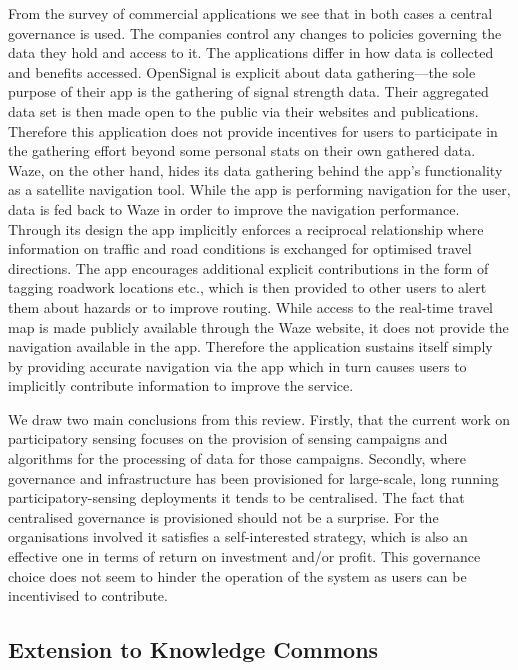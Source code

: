 From the survey of commercial applications we see that 
in both cases a central governance is used. The companies control any changes to policies governing the data they hold and access to it. The applications differ in how data is collected and benefits accessed. 
OpenSignal is explicit about data gathering---the sole purpose of their app is the gathering of signal strength data. 
Their aggregated data set is then made open to the public via their websites and publications. Therefore this application does not provide incentives for users to participate in the gathering effort beyond some personal stats on their own gathered data. Waze, on the other hand, hides its data gathering behind the app's functionality as a satellite navigation tool. 
While the app is performing navigation for the user, data is fed back to Waze in order to improve the navigation performance. 
Through its design the app implicitly enforces a reciprocal relationship where information on traffic and road conditions is exchanged for optimised travel directions. 
The app encourages additional explicit contributions in the form of tagging roadwork locations etc., which is then provided to other users to alert them about hazards or to improve routing. 
While access to the real-time travel map is made publicly available through the Waze website, it does not provide the navigation available in the app. Therefore the application sustains itself simply by providing accurate navigation via the app which in turn causes users to implicitly contribute information to improve the service.



We draw two main conclusions from this review. Firstly, that the current work on participatory sensing focuses on the provision of sensing campaigns and algorithms for the processing of data for those campaigns. Secondly, where governance and infrastructure has been provisioned for large-scale, long running participatory-sensing deployments it tends to be centralised. The fact that centralised governance is provisioned should not be a surprise. 
For the organisations involved it satisfies a self-interested strategy, which is also an effective one in terms of return on investment and/or profit. 
This governance choice does not seem to hinder the operation of the system as users can be incentivised to contribute.

\subsection{Extension to Knowledge Commons}

